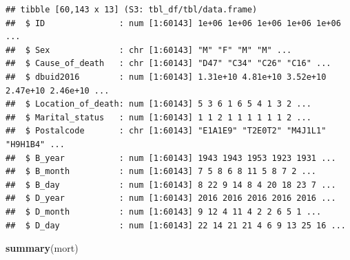 \documentclass[
  11pt,
  oneside]{book}
\newenvironment{Shaded}{\begin{snugshade}}{\end{snugshade}}
\newcommand{\FunctionTok}[1]{\textcolor[rgb]{0.13,0.29,0.53}{\textbf{#1}}}
\newcommand{\NormalTok}[1]{#1}
\begin{document}
\begin{verbatim}
## tibble [60,143 x 13] (S3: tbl_df/tbl/data.frame)
##  $ ID               : num [1:60143] 1e+06 1e+06 1e+06 1e+06 1e+06 ...
##  $ Sex              : chr [1:60143] "M" "F" "M" "M" ...
##  $ Cause_of_death   : chr [1:60143] "D47" "C34" "C26" "C16" ...
##  $ dbuid2016        : num [1:60143] 1.31e+10 4.81e+10 3.52e+10 2.47e+10 2.46e+10 ...
##  $ Location_of_death: num [1:60143] 5 3 6 1 6 5 4 1 3 2 ...
##  $ Marital_status   : num [1:60143] 1 1 2 1 1 1 1 1 1 2 ...
##  $ Postalcode       : chr [1:60143] "E1A1E9" "T2E0T2" "M4J1L1" "H9H1B4" ...
##  $ B_year           : num [1:60143] 1943 1943 1953 1923 1931 ...
##  $ B_month          : num [1:60143] 7 5 8 6 8 11 5 8 7 2 ...
##  $ B_day            : num [1:60143] 8 22 9 14 8 4 20 18 23 7 ...
##  $ D_year           : num [1:60143] 2016 2016 2016 2016 2016 ...
##  $ D_month          : num [1:60143] 9 12 4 11 4 2 2 6 5 1 ...
##  $ D_day            : num [1:60143] 22 14 21 21 4 6 9 13 25 16 ...
\end{verbatim}

\begin{Shaded}
\begin{Highlighting}[]
\FunctionTok{summary}\NormalTok{(mort)}
\end{Highlighting}
\end{Shaded}
\end{document}
